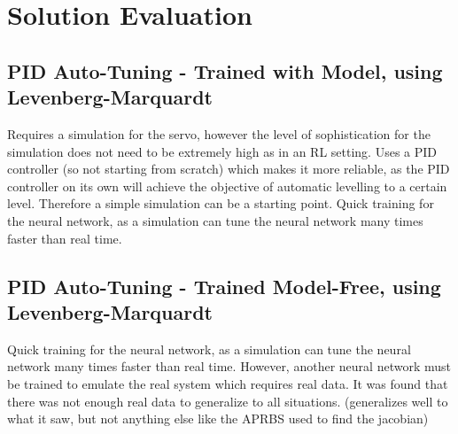 \documentclass[letterpaper,12pt]{article}
\begin{document}


\section{Solution Evaluation}

\subsection{PID Auto-Tuning - Trained with Model, using Levenberg-Marquardt}
Requires a simulation for the servo, however the level of sophistication for the simulation does not need to be extremely high as in an RL setting. Uses a PID controller (so not starting from scratch) which makes it more reliable, as the PID controller on its own will achieve the objective of automatic levelling to a certain level. Therefore a simple simulation can be a starting point.
Quick training for the neural network, as a simulation can tune the neural network many times faster than real time.
\subsection{PID Auto-Tuning - Trained Model-Free, using Levenberg-Marquardt}
Quick training for the neural network, as a simulation can tune the neural network many times faster than real time. However, another neural network must be trained to emulate the real system which requires real data. It was found that there was not enough real data to generalize to all situations. (generalizes well to what it saw, but not anything else like the APRBS used to find the jacobian)
\end{document}
